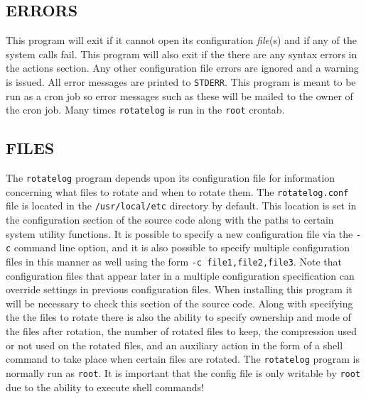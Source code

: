 \documentclass{article}
\begin{document}
\subsection*{ERRORS}%

This program will exit if it cannot open its configuration {\em file\/}(s) and if
any of the system calls fail.  This program will also exit if the there
are any syntax errors in the actions section.  Any other configuration
file errors are ignored and a warning is issued.  All error messages are
printed to {\tt STDERR}.  This program is meant to be run as a cron job so
error messages such as these will be mailed to the owner of the cron
job.  Many times {\tt rotatelog} is run in the {\tt root} crontab.

\subsection*{FILES}
The {\tt rotatelog} program depends upon its configuration file for
information concerning what files to rotate and when to rotate them.
The {\tt rotatelog.conf} file is located in the {\tt /usr/local/etc} directory
by default.  This location is set in the configuration section of the
source code along with the paths to certain system utility functions.
It is possible to specify a new configuration file via the {\tt -c} command
line option, and it is also possible to specify multiple configuration
files in this manner as well using the form {\tt -c file1,file2,file3}.
Note that configuration files that appear later in a multiple
configuration specification can override settings in previous
configuration files.  When installing this program it will be necessary
to check this section of the source code.  Along with specifying the the
files to rotate there is also the ability to specify ownership and mode
of the files after rotation, the number of rotated files to keep, the
compression used or not used on the rotated files, and an auxiliary
action in the form of a shell command to take place when certain files
are rotated.  The {\tt rotatelog} program is normally run as {\tt root}.  It
is important that the config file is only writable by {\tt root} due to the
ability to execute shell commands!
\end{document}
